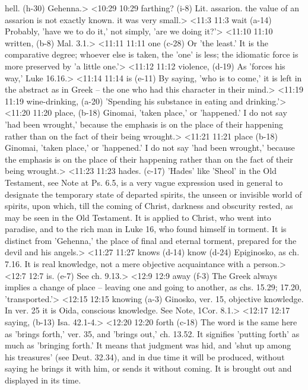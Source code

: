   hell. (h-30)  Gehenna.>
<10:29 10:29  farthing? (i-8)  Lit. assarion. the value of an assarion is not exactly  known. it was very small.>
<11:3 11:3  wait (a-14)  Probably, 'have we to do it,' not simply, 'are we doing it?'>
<11:10 11:10  written, (b-8)  Mal. 3.1.>
<11:11 11:11  one (c-28)  Or 'the least.' It is the comparative degree; whoever else is  taken, the 'one' is less; the idiomatic force is more preserved  by 'a little one.'>
<11:12 11:12  violence, (d-19)  As 'forces his way,' Luke 16.16.>
<11:14 11:14  is (e-11)  By saying, 'who is to come,' it is left in the abstract as in  Greek -- the one who had this character in their mind.>
<11:19 11:19  wine-drinking, (a-20)  'Spending his substance in eating and drinking.'>
<11:20 11:20  place, (b-18)  Ginomai, 'taken place,' or 'happened.' I do not say 'had  been wrought,' because the emphasis is on the place of their  happening rather than on the fact of their being wrought.>
<11:21 11:21  place (b-18)  Ginomai, 'taken place,' or 'happened.' I do not say 'had  been wrought,' because the emphasis is on the place of their  happening rather than on the fact of their being wrought.>
<11:23 11:23  hades. (c-17)  'Hades' like 'Sheol' in the Old Testament, see Note at Ps.  6.5, is a very vague expression used in general to designate  the temporary state of departed spirits, the unseen or  invisible world of spirits, upon which, till the coming of  Christ, darkness and obscurity rested, as may be seen in the  Old Testament. It is applied to Christ, who went into paradise,  and to the rich man in Luke 16, who found himself in torment.  It is distinct from 'Gehenna,' the place of final and eternal  torment, prepared for the devil and his angels.>
<11:27 11:27  knows (d-14)  know (d-24)
  Epiginosko, as ch. 7.16. It is real knowledge, not a mere  objective acquaintance with a person.>
<12:7 12:7  is. (e-7)  See ch. 9.13.>
<12:9 12:9  away (f-3)  The Greek always implies a change of place -- leaving one and  going to another, as chs. 15.29; 17.20, 'transported.'>
<12:15 12:15  knowing (a-3)  Ginosko, ver. 15, objective knowledge. In ver. 25 it is  Oida, conscious knowledge. See Note, 1Cor. 8.1.>
<12:17 12:17  saying, (b-13)  Isa. 42.1-4.>
<12:20 12:20  forth (c-18)  The word is the same here as 'brings forth,' ver. 35, and  'brings out,' ch. 13.52. It signifies 'putting forth' as much  as 'bringing forth.' It means that judgment was hid, and 'shut  up among his treasures' (see Deut. 32.34), and in due time it  will be produced, without saying he brings it with him, or  sends it without coming. It is brought out and displayed in its  time.
